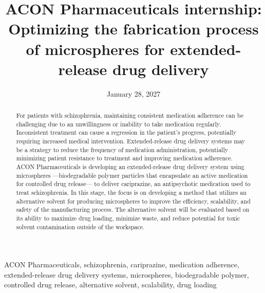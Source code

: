 \documentclass[12pt,conference,onecolumn]{IEEEtran}
\title{ACON Pharmaceuticals internship: Optimizing the fabrication process of microspheres for extended-release drug delivery}
\author{%
\IEEEauthorblockN{Reese Wallace}\IEEEauthorblockA{Science \& Engineering\\Manalapan High School\\Englishtown, NJ\\\href{mailto:427rwallace@frhsd.com}{427rwallace@frhsd.com}}
}
\date{January 28, 2027}
\newcommand{\keywords}{ACON Pharmaceuticals, schizophrenia, cariprazine, medication adherence, extended-release drug delivery systems, microspheres, biodegradable polymer, controlled drug release, alternative solvent, scalability, drug loading}
\begin{document}
\maketitle 

\begin{abstract}
For patients with schizophrenia, maintaining consistent medication adherence can be challenging due to an unwillingness or inability to take medication regularly. Inconsistent treatment can cause a regression in the patient’s progress, potentially requiring increased medical intervention. Extended-release drug delivery systems may be a strategy to reduce the frequency of medication administration, potentially minimizing patient resistance to treatment and improving medication adherence. ACON Pharmaceuticals is developing an extended-release drug delivery system using microspheres —biodegradable polymer particles that encapsulate an active medication for controlled drug release— to deliver cariprazine, an antipsychotic medication used to treat schizophrenia. In this stage, the focus is on developing a method that utilizes an alternative solvent for producing microspheres to improve the efficiency, scalability, and safety of the manufacturing process. The alternative solvent will be evaluated based on its ability to maximize drug loading, minimize waste, and reduce potential for toxic solvent contamination outside of the workspace.
\end{abstract}

\begin{IEEEkeywords}
\keywords
\end{IEEEkeywords}
\end{document}
